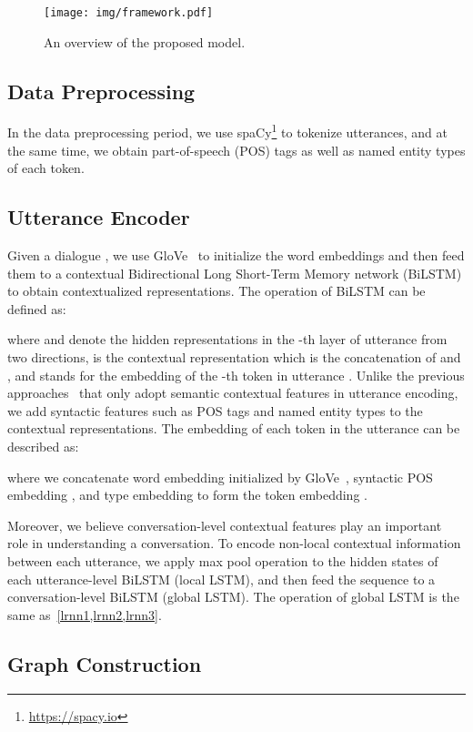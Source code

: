 \documentclass[11pt]{article}
\begin{document}
\begin{figure*}[ht]
\centering
\texttt{[image: img/framework.pdf]}
\caption{An overview of the proposed model.}
\label{fig2}
\end{figure*}


\subsection{Data Preprocessing}
In the data preprocessing period, we use spaCy\footnote{\url{https://spacy.io}} to tokenize utterances, and at the same time, we obtain part-of-speech (POS) tags as well as named entity types of each token.

\subsection{Utterance Encoder}
Given a dialogue , we use GloVe~\cite{pennington2014glove} to initialize the word embeddings and then feed them to a contextual Bidirectional Long Short-Term Memory network (BiLSTM) to obtain contextualized representations. The operation of BiLSTM can be defined as:

where  and  denote the hidden representations in the -th layer of utterance  from two directions,  is the contextual representation which is the concatenation of  and , and  stands for the embedding of the -th token in utterance . Unlike the previous approaches~\cite{christopoulou2019connecting,nan2020reasoning} that only adopt semantic contextual features in utterance encoding, we add syntactic features such as POS tags and named entity types to the contextual representations. The embedding of each token in the utterance can be described as:

where we concatenate word embedding  initialized by GloVe~\cite{pennington2014glove}, syntactic POS embedding , and type embedding  to form the token embedding .

Moreover, we believe conversation-level contextual features play an important role in understanding a conversation. To encode non-local contextual information between each utterance, we apply max pool operation to the hidden states of each utterance-level BiLSTM (local LSTM), and then feed the sequence  to a conversation-level BiLSTM (global LSTM). The operation of global LSTM is the same as~\cref{lrnn1,lrnn2,lrnn3}.

\subsection{Graph Construction}
\end{document}
